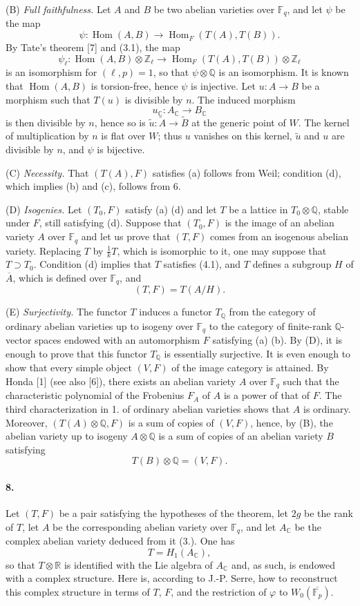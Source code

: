 \documentclass[10pt]{article}
\newcommand{\C}{\mathbb C}
\newcommand{\Fp}{\mathbb F_p}
\newcommand{\Fq}{\mathbb F_q}
\newcommand{\Q}{\mathbb Q}
\newcommand{\R}{\mathbb R}
\newcommand{\Z}{\mathbb Z}
\newcommand{\Ac}{A_{\C}}
\newcommand{\Hom}{\operatorname{Hom}}
\begin{document}
(B) \emph{Full faithfulness.} Let $A$ and $B$ be two abelian varieties over $\Fq$, and let $\psi$ be the map
\[
\psi:\Hom(A,B)\longrightarrow\Hom_F(T(A),T(B)).
\]
By Tate's theorem [7] and (3.1), the map
\[
\psi_\ell:\Hom(A,B)\otimes\Z_\ell
\longrightarrow
\Hom_F(T(A),T(B))\otimes\Z_\ell
\]
is an isomorphism for $(\ell,p)=1$, so that $\psi\otimes\Q$ is an isomorphism. It is known that $\Hom(A,B)$ is torsion-free, hence $\psi$ is injective. Let $u:A\to B$ be a morphism such that $T(u)$ is divisible by $n$. The induced morphism
\[
u_{\C}:\Ac\longrightarrow B_{\C}
\]
is then divisible by $n$, hence so is $\widetilde u:\widetilde A\to\widetilde B$ at the generic point of $W$. The kernel of multiplication by $n$ is flat over $W$; thus $u$ vanishes on this kernel, $\widetilde u$ and $u$ are divisible by $n$, and $\psi$ is bijective.

(C) \emph{Necessity.} That $(T(A),F)$ satisfies (a) follows from Weil; condition (d), which implies (b) and (c), follows from 6.

(D) \emph{Isogenies.} Let $(T_0,F)$ satisfy (a) (d) and let $T$ be a lattice in $T_0\otimes\Q$, stable under $F$, still satisfying (d). Suppose that $(T_0,F)$ is the image of an abelian variety $A$ over $\Fq$ and let us prove that $(T,F)$ comes from an isogenous abelian variety. Replacing $T$ by $\frac1kT$, which is isomorphic to it, one may suppose that $T\supset T_0$. Condition (d) implies that $T$ satisfies (4.1), and $T$ defines a subgroup $H$ of $\overline A$, which is defined over $\Fq$, and
\[
(T,F)=T(A/H).
\]

(E) \emph{Surjectivity.} The functor $T$ induces a functor $T_\Q$ from the category of ordinary abelian varieties up to isogeny over $\Fq$ to the category of finite-rank $\Q$-vector spaces endowed with an automorphism $F$ satisfying (a) (b). By (D), it is enough to prove that this functor $T_\Q$ is essentially surjective. It is even enough to show that every simple object $(V,F)$ of the image category is attained. By Honda [1] (see also [6]), there exists an abelian variety $A$ over $\Fq$ such that the characteristic polynomial of the Frobenius $F_A$ of $A$ is a power of that of $F$. The third characterization in 1. of ordinary abelian varieties shows that $A$ is ordinary. Moreover, $(T(A)\otimes\Q,F)$ is a sum of copies of $(V,F)$, hence, by (B), the abelian variety up to isogeny $A\otimes\Q$ is a sum of copies of an abelian variety $B$ satisfying
\[
T(B)\otimes\Q=(V,F).
\]

\paragraph{8.} Let $(T,F)$ be a pair satisfying the hypotheses of the theorem, let $2g$ be the rank of $T$, let $A$ be the corresponding abelian variety over $\Fq$, and let $\Ac$ be the complex abelian variety deduced from it (3.). One has
\[
T=H_1(\Ac),
\]
so that $T\otimes\R$ is identified with the Lie algebra of $\Ac$ and, as such, is endowed with a complex structure. Here is, according to J.-P. Serre, how to reconstruct this complex structure in terms of $T$, $F$, and the restriction of $\varphi$ to $W_0(\overline{\Fp})$.
\end{document}
